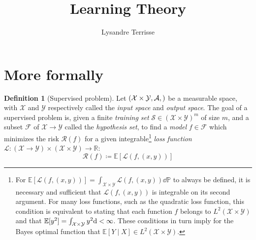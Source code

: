 \documentclass{article}
\title{Learning Theory}
\author{Lysandre Terrisse}
\theoremstyle{definition}
\newtheorem{definition}{Definition}[section]
\theoremstyle{remark}
\theoremstyle{example}
\let\P\relax
\newcommand{\E}[1]{\mathbb{E}[#1]}
\begin{document}
\maketitle

\section{More formally}



\begin{definition}[Supervised problem]
		Let $(\mathcal{X} \times \mathcal{Y}, \mathcal{A}, \P)$ be a measurable space, with $\mathcal{X}$ and $\mathcal{Y}$ respectively called the \textit{input space} and \textit{output space}. The goal of a supervised problem is, given a finite \textit{training set} $\mathcal{S} \in (\mathcal{X} \times \mathcal{Y})^m$ of size $m$, and a subset $\mathcal{F}$ of $\mathcal{X} \rightarrow \mathcal{Y}$ called the \textit{hypothesis set}, to find a \textit{model} $f \in \mathcal{F}$ which minimizes the risk $\mathcal{R}(f)$ for a given integrable\footnote{For $\E{\mathcal{L}(f, (x, y))} = \int_{\mathcal{X} \times \mathcal{Y}} \mathcal{L}(f, (x, y)) \dd \mathbb{P}$ to always be defined, it is necessary and sufficient that $\mathcal{L}(f, (x, y))$ is integrable on its second argument. For many loss functions, such as the quadratic loss function, this condition is equivalent to stating that each function $f$ belongs to $L^2(\mathcal{X} \times \mathcal{Y})$ and that $\E{y^2} = \int_{\mathcal{X} \times \mathcal{Y}} y^2 \dd \P < \infty$. These conditions in turn imply for the Bayes optimal function that $\E{Y \mid X} \in L^2(\mathcal{X} \times \mathcal{Y})$.} \textit{loss function} $\mathcal{L} : (\mathcal{X} \rightarrow \mathcal{Y}) \times (\mathcal{X} \times \mathcal{Y}) \rightarrow \mathbb{R}$:
		$$\mathcal{R}(f) \coloneq \E{\mathcal{L}(f, (x, y))}$$
\end{definition}
\end{document}
